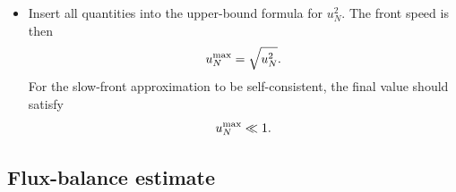 \begin{itemize}
\begin{equation}
0<a_{Q*}^{\rm max}<1,
\qquad
1+\xi a_{Q*}^{\rm max}>0.
\end{equation}
If \(a_{Q*}^{\rm max}\) is not small, the leading expansion around
\(\mu_K=T=0\) should be replaced by a numerical EOS evaluation.
\item Insert all quantities into the upper-bound formula for \(u_N^2\). The
front speed is then
\begin{equation}
u_N^{\rm max}=\sqrt{u_N^2}.
\end{equation}
For the slow-front approximation to be self-consistent, the final value should
satisfy
\begin{equation}
u_N^{\rm max}\ll1.
\end{equation}
\end{itemize}

\clearpage

\subsection{Flux-balance estimate}
\label{sec:flux-balance-estimate}

